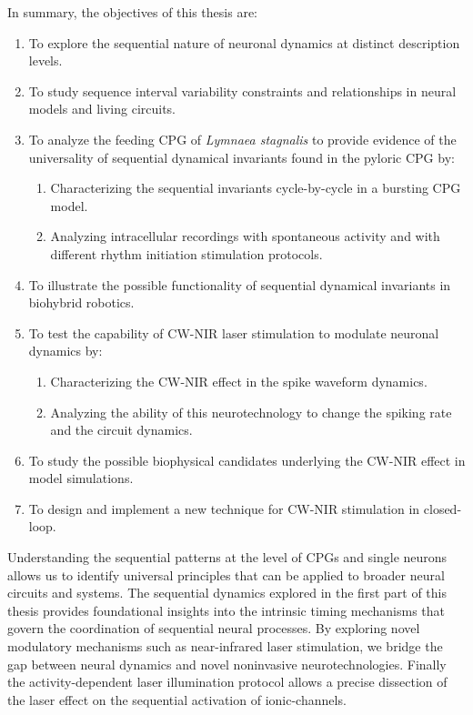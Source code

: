 In summary, the objectives of this thesis are:
\begin{enumerate}
    \item To explore the sequential nature of neuronal dynamics at distinct description levels. 
    \item To study sequence interval variability constraints and relationships in neural models and living circuits.
    \item To analyze the feeding CPG of \textit{Lymnaea stagnalis} to provide evidence of the universality of sequential dynamical invariants found in the pyloric CPG by:
    \begin{enumerate}
        \item Characterizing the sequential invariants cycle-by-cycle in a bursting CPG model. 
        \item Analyzing intracellular recordings with spontaneous activity and with different rhythm initiation stimulation protocols. 
    \end{enumerate}
    \item To illustrate the possible functionality of sequential dynamical invariants in biohybrid robotics. 
    \item To test the capability of CW-NIR laser stimulation to modulate neuronal dynamics by: 
    \begin{enumerate}
        \item Characterizing the CW-NIR effect in the spike waveform dynamics. 
        \item Analyzing  the ability of this neurotechnology to change the spiking rate and the circuit dynamics. 
    \end{enumerate}
    \item To study the possible biophysical candidates underlying the CW-NIR effect in model simulations. 
    \item To design and implement a new technique for CW-NIR stimulation in closed-loop. 
\end{enumerate}

Understanding the sequential patterns at the level of CPGs and single neurons allows us to identify universal principles that can be applied to broader neural circuits and systems. The sequential dynamics explored in the first part of this thesis provides foundational insights into the intrinsic timing mechanisms that govern the coordination of sequential neural processes. By exploring novel modulatory  mechanisms such as near-infrared laser stimulation, we bridge the gap between neural dynamics and novel noninvasive neurotechnologies. Finally the activity-dependent laser illumination protocol allows a precise dissection of the laser effect on the sequential activation of  ionic-channels. 
